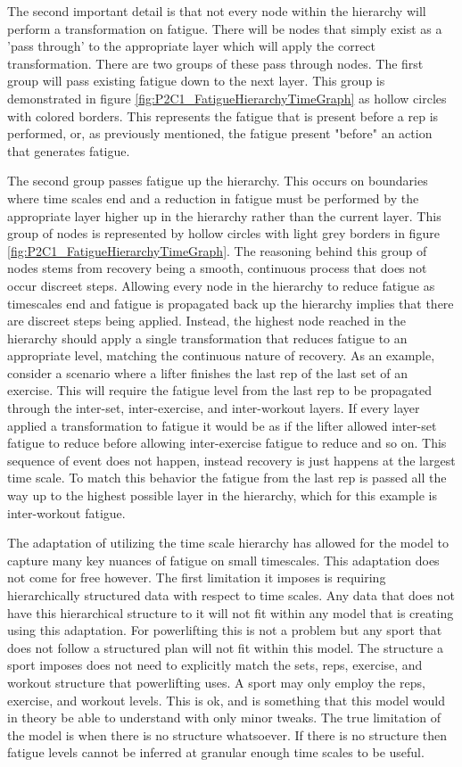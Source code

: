 The second important detail is that not every node within the hierarchy will perform a transformation on fatigue. There will be nodes that simply exist as a 'pass through' to the appropriate layer which will apply the correct transformation. There are two groups of these pass through nodes. The first group will pass existing fatigue down to the next layer. This group is demonstrated in figure \ref{fig:P2C1_FatigueHierarchyTimeGraph} as hollow circles with colored borders. This represents the fatigue that is present before a rep is performed, or, as previously mentioned, the fatigue present "before" an action that generates fatigue.

The second group passes fatigue up the hierarchy. This occurs on boundaries where time scales end and a reduction in fatigue must be performed by the appropriate layer higher up in the hierarchy rather than the current layer. This group of nodes is represented by hollow circles with light grey borders in figure \ref{fig:P2C1_FatigueHierarchyTimeGraph}. The reasoning behind this group of nodes stems from recovery being a smooth, continuous process that does not occur discreet steps. Allowing every node in the hierarchy to reduce fatigue as timescales end and fatigue is propagated back up the hierarchy implies that there are discreet steps being applied. Instead, the highest node reached in the hierarchy should apply a single transformation that reduces fatigue to an appropriate level, matching the continuous nature of recovery. As an example, consider a scenario where a lifter finishes the last rep of the last set of an exercise. This will require the fatigue level from the last rep to be propagated through the inter-set, inter-exercise, and inter-workout layers. If every layer applied a transformation to fatigue it would be as if the lifter allowed inter-set fatigue to reduce before allowing inter-exercise fatigue to reduce and so on. This sequence of event does not happen, instead recovery is just happens at the largest time scale. To match this behavior the fatigue from the last rep is passed all the way up to the highest possible layer in the hierarchy, which for this example is inter-workout fatigue.

The adaptation of utilizing the time scale hierarchy has allowed for the model to capture many key nuances of fatigue on small timescales. This adaptation does not come for free however. The first limitation it imposes is requiring hierarchically structured data with respect to time scales. Any data that does not have this hierarchical structure to it will not fit within any model that is creating using this adaptation. For powerlifting this is not a problem but any sport that does not follow a structured plan will not fit within this model. The structure a sport imposes does not need to explicitly match the sets, reps, exercise, and workout structure that powerlifting uses. A sport may only employ the reps, exercise, and workout levels. This is ok, and is something that this model would in theory be able to understand with only minor tweaks. The true limitation of the model is when there is no structure whatsoever. If there is no structure then fatigue levels cannot be inferred at granular enough time scales to be useful. 

